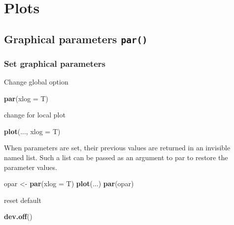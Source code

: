 \documentclass[]{book}
\newenvironment{Shaded}{\begin{snugshade}}{\end{snugshade}}
\newcommand{\KeywordTok}[1]{\textcolor[rgb]{0.13,0.29,0.53}{\textbf{#1}}}
\newcommand{\DataTypeTok}[1]{\textcolor[rgb]{0.13,0.29,0.53}{#1}}
\newcommand{\StringTok}[1]{\textcolor[rgb]{0.31,0.60,0.02}{#1}}
\newcommand{\NormalTok}[1]{#1}
\begin{document}
\chapter{Plots}\label{Plots}

\section{\texorpdfstring{Graphical parameters
\texttt{par()}}{Graphical parameters par()}}\label{graphical-parameters-par}

\subsection{Set graphical parameters}\label{set-graphical-parameters}

Change global option

\begin{Shaded}
\begin{Highlighting}[]
\KeywordTok{par}\NormalTok{(}\DataTypeTok{xlog =}\NormalTok{ T)}
\end{Highlighting}
\end{Shaded}

change for local plot

\begin{Shaded}
\begin{Highlighting}[]
\KeywordTok{plot}\NormalTok{(..., }\DataTypeTok{xlog =}\NormalTok{ T)}
\end{Highlighting}
\end{Shaded}

When parameters are set, their previous values are returned in an
invisible named list. Such a list can be passed as an argument to par to
restore the parameter values.

\begin{Shaded}
\begin{Highlighting}[]
\NormalTok{opar <-}\StringTok{ }\KeywordTok{par}\NormalTok{(}\DataTypeTok{xlog =}\NormalTok{ T)}
\KeywordTok{plot}\NormalTok{(...)}
\KeywordTok{par}\NormalTok{(opar)}
\end{Highlighting}
\end{Shaded}

reset default

\begin{Shaded}
\begin{Highlighting}[]
\KeywordTok{dev.off}\NormalTok{()}
\end{Highlighting}
\end{Shaded}
\end{document}
